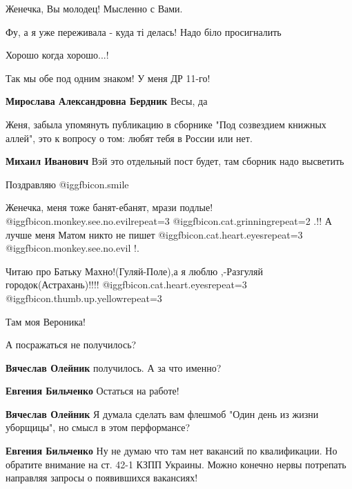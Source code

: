 \begin{itemize}
Женечка, Вы молодец! Мысленно с Вами.


Фу, а я уже переживала - куда ті делась! Надо біло просигналить

Хорошо когда хорошо...!


Так мы обе под одним знаком! У меня ДР 11-го!

\begin{itemize} %
\textbf{Мирослава Александровна Бердник} Весы, да
\end{itemize} %

Женя, забыла упомянуть публикацию в сборнике "Под созвездием книжных аллей",
это к вопросу о том: любят тебя в России или нет.

\begin{itemize} %
\textbf{Михаил Иванович} Вэй это отдельный пост будет, там сборник надо высветить
\end{itemize} %

Поздравляю  @igg{fbicon.smile} 

Женечка, меня тоже банят-ебанят, мрази подлые!
@igg{fbicon.monkey.see.no.evil}{repeat=3}  @igg{fbicon.cat.grinning}{repeat=2} .!!
А лучше меня Матом никто не
пишет @igg{fbicon.cat.heart.eyes}{repeat=3}  @igg{fbicon.monkey.see.no.evil} !.

Читаю про Батьку Махно!(Гуляй-Поле),а я люблю ,-Разгуляй городок(Астрахань)!!!! @igg{fbicon.cat.heart.eyes}{repeat=3}  @igg{fbicon.thumb.up.yellow}{repeat=3} 

Там моя Вероника!

А посражаться не получилось?

\begin{itemize} %
\textbf{Вячеслав Олейник} получилось. А за что именно?

\textbf{Евгения Бильченко} Остаться на работе!

\textbf{Вячеслав Олейник} Я думала сделать вам флешмоб "Один день из жизни уборщицы", но смысл в этом перформансе?

\textbf{Евгения Бильченко} Ну не думаю что там нет вакансий по квалификации. Но обратите внимание на ст. 42-1 КЗПП Украины. Можно конечно нервы потрепать направляя запросы о появившихся вакансиях!


\end{itemize}
\end{itemize}
